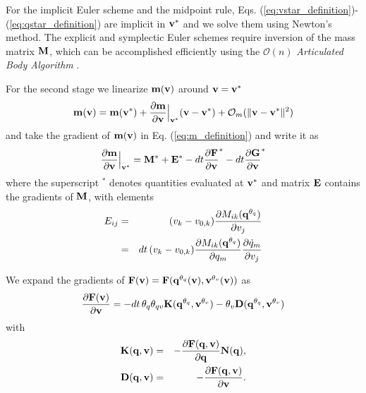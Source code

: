 For the implicit Euler scheme and the midpoint rule, Eqs.
(\ref{eq:vstar_definition})-(\ref{eq:qstar_definition}) are implicit in
${\mathbf{v}}^*$ and we solve them using Newton's method. The explicit and symplectic
Euler schemes require inversion of the mass matrix ${\mathbf{M}}$, which can be
accomplished efficiently using the $\mathcal{O}(n)$
\emph{Articulated Body Algorithm}
\cite{bib:featherstone2008_rigid_body_dynamics_algorithms}.

For the second stage we linearize ${\mathbf{m}}({\mathbf{v}})$ around ${\mathbf{v}} = {\mathbf{v}}^*$ 
\begin{eqnarray}
	{\mathbf{m}}({\mathbf{v}}) = {\mathbf{m}}({\mathbf{v}}^*) +
	\frac{\partial{\mathbf{m}}}{\partial{\mathbf{v}}}\Bigr|_{{\mathbf{v}}^*}({\mathbf{v}}-{\mathbf{v}}^*) + \mathcal{O}_m(\Vert{\mathbf{v}}-{\mathbf{v}}^*\Vert^2)
\end{eqnarray}
and take the gradient of ${\mathbf{m}}({\mathbf{v}})$ in Eq. (\ref{eq:m_definition})
and write it as
\begin{eqnarray}
	\frac{\partial{\mathbf{m}}}{\partial{\mathbf{v}}}\Bigr|_{{\mathbf{v}}^*} = 
	{\mathbf{M}}^* + {\mathbf{E}}^* -
	dt\frac{\partial{\mathbf{F}}}{\partial{\mathbf{v}}}^* -
	dt\frac{\partial{\mathbf{G}}}{\partial{\mathbf{v}}}^*
\end{eqnarray}
where the superscript $^*$ denotes quantities evaluated at ${\mathbf{v}}^*$ and matrix ${\mathbf{E}}$ contains the gradients of ${\mathbf{M}}$, with elements
\begin{eqnarray}
	E_{ij} &= &
	(v_k-v_{0,k}) 
	\frac{\partial M_{ik}({\mathbf{q}}^{\theta_q})}{\partial v_j}\nonumber\\
	&=&dt\,(v_k-v_{0,k}) 
	\frac{\partial M_{ik}({\mathbf{q}}^{\theta_q})}{\partial
	q_m}\frac{\partial\dot{q}_m}{\partial v_j}
\end{eqnarray}

We expand the gradients of ${\mathbf{F}}({\mathbf{v}})={\mathbf{F}}({\mathbf{q}}^{\theta_{q}}({\mathbf{v}}), {\mathbf{v}}^{\theta_v}({\mathbf{v}}))$ as
\begin{eqnarray}
	\frac{\partial{\mathbf{F}}({\mathbf{v}})}{\partial{\mathbf{v}}} =
	-dt\,\theta_q\theta_{qv}{\mathbf{K}}({\mathbf{q}}^{\theta_q}, {\mathbf{v}}^{\theta_v})-\theta_v{\mathbf{D}}({\mathbf{q}}^{\theta_q}, {\mathbf{v}}^{\theta_v})
\end{eqnarray}
with 
\begin{eqnarray}
	\mf{K}(\mf{q}, \mf{v})&=&-\frac{\partial \mf{F}(\mf{q}, \mf{v})}{\partial \mf{q}}\mf{N}(\mf{q}),\\
	\mf{D}(\mf{q}, \mf{v})&=&-\frac{\partial \mf{F}(\mf{q}, \mf{v})}{\partial \mf{v}}.
	\label{eq:dissipation_matrix}
\end{eqnarray}

